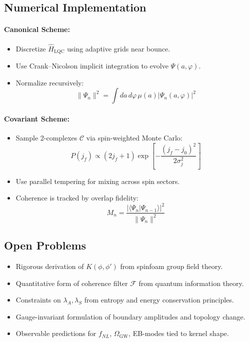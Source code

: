 \subsection{Numerical Implementation}
\label{subsec:numerics}

\paragraph{Canonical Scheme:}
\begin{itemize}
    \item Discretize \(\hat{H}_{\text{LQC}}\) using adaptive grids near bounce.
    \item Use Crank–Nicolson implicit integration to evolve \(\Psi(a,\varphi)\).
    \item Normalize recursively:
    \begin{equation}
    \|\Psi_n\|^2 = \int da\,d\varphi\, \mu(a) |\Psi_n(a,\varphi)|^2
    \end{equation}
\end{itemize}

\paragraph{Covariant Scheme:}
\begin{itemize}
    \item Sample 2-complexes \(\mathcal{C}\) via spin-weighted Monte Carlo:
    \begin{equation}
    P(j_f) \propto (2j_f + 1) \exp\left[ -\frac{(j_f - j_0)^2}{2\sigma_j^2} \right]
    \end{equation}
    \item Use parallel tempering for mixing across spin sectors.
    \item Coherence is tracked by overlap fidelity:
    \begin{equation}
    M_n = \frac{|\langle \Psi_n | \Psi_{n-1} \rangle|^2}{\|\Psi_n\|^2}
    \end{equation}
\end{itemize}

\subsection{Open Problems}
\label{subsec:open_problems}

\begin{itemize}
    \item Rigorous derivation of \(K(\phi,\phi')\) from spinfoam group field theory.
    \item Quantitative form of coherence filter \(\mathcal{F}\) from quantum information theory.
    \item Constraints on \(\lambda_A, \lambda_S\) from entropy and energy conservation principles.
    \item Gauge-invariant formulation of boundary amplitudes and topology change.
    \item Observable predictions for \(f_{NL}\), \(\Omega_{\text{GW}}\), EB-modes tied to kernel shape.
\end{itemize}
